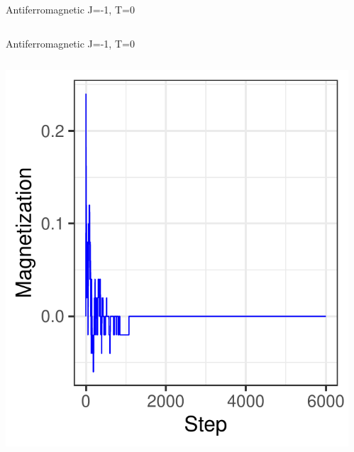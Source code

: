 \documentclass{beamer}
\begin{document}
\begin{frame}{Antiferromagnetic J=-1, T=0}
\begin{columns}
\begin{column}{0.5\textwidth}
\begin{center}
     \end{center}
\end{column}
\end{columns}
\end{frame}

\begin{frame}{Antiferromagnetic J=-1, T=0}
\begin{columns}
\begin{column}{0.5\textwidth}
    \begin{center}
     \includegraphics[width=\textwidth]{Pic/J-1_10_6000_T=0_Magnetization.pdf}
     \end{center}
\end{column}
\begin{column}{0.5\textwidth}
    \begin{center}

\end{center}
\end{column}
\end{columns}
\end{frame}
\end{document}
